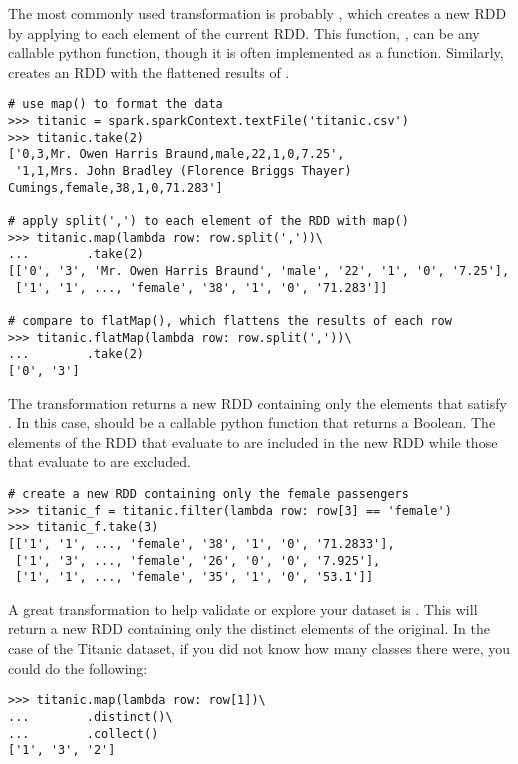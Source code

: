 The most commonly used transformation is probably , which creates a new RDD by applying  to each element of the current RDD. This function, , can be any callable python function, though it is often implemented as a  function.
Similarly,  creates an RDD with the flattened results of .

\begin{lstlisting}
# use map() to format the data
>>> titanic = spark.sparkContext.textFile('titanic.csv')
>>> titanic.take(2)
['0,3,Mr. Owen Harris Braund,male,22,1,0,7.25',
 '1,1,Mrs. John Bradley (Florence Briggs Thayer) Cumings,female,38,1,0,71.283']

# apply split(',') to each element of the RDD with map()
>>> titanic.map(lambda row: row.split(','))\
...		   .take(2)
[['0', '3', 'Mr. Owen Harris Braund', 'male', '22', '1', '0', '7.25'],
 ['1', '1', ..., 'female', '38', '1', '0', '71.283']]
 
# compare to flatMap(), which flattens the results of each row
>>> titanic.flatMap(lambda row: row.split(','))\
...		   .take(2)
['0', '3']
\end{lstlisting}

The  transformation returns a new RDD containing only the elements that satisfy . In this case,  should be a callable python function that returns a Boolean. The elements of the RDD that evaluate to  are included in the new RDD while those that evaluate to  are excluded.


\begin{lstlisting}
# create a new RDD containing only the female passengers
>>> titanic_f = titanic.filter(lambda row: row[3] == 'female')
>>> titanic_f.take(3)
[['1', '1', ..., 'female', '38', '1', '0', '71.2833'],
 ['1', '3', ..., 'female', '26', '0', '0', '7.925'],
 ['1', '1', ..., 'female', '35', '1', '0', '53.1']]
\end{lstlisting}

\begin{info}
A great transformation to help validate or explore your dataset is . This will return a new RDD containing only the distinct elements of the original. In the case of the Titanic dataset, if you did not know how many classes there were, you could do the following: 
\begin{lstlisting}
>>> titanic.map(lambda row: row[1])\
...		   .distinct()\
...		   .collect()
['1', '3', '2']
\end{lstlisting}
\end{info}


